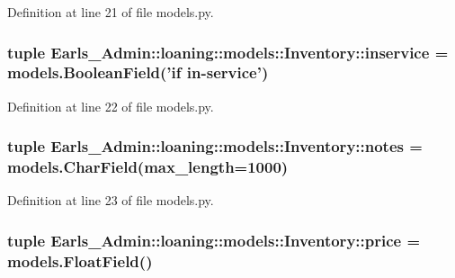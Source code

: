 Definition at line 21 of file models.py.\hypertarget{classEarls__Admin_1_1loaning_1_1models_1_1Inventory_065d22d6f328305f5b3ae87f961646de}{
\subsubsection[inservice]{\setlength{\rightskip}{0pt plus 5cm}tuple {\bf Earls\_\-Admin::loaning::models::Inventory::inservice} = models.BooleanField('if in-service')}}
\label{classEarls__Admin_1_1loaning_1_1models_1_1Inventory_065d22d6f328305f5b3ae87f961646de}




Definition at line 22 of file models.py.\hypertarget{classEarls__Admin_1_1loaning_1_1models_1_1Inventory_84dc6e3885385f9a8e756bff4ede9f3a}{
\subsubsection[notes]{\setlength{\rightskip}{0pt plus 5cm}tuple {\bf Earls\_\-Admin::loaning::models::Inventory::notes} = models.CharField(max\_\-length=1000)}}
\label{classEarls__Admin_1_1loaning_1_1models_1_1Inventory_84dc6e3885385f9a8e756bff4ede9f3a}




Definition at line 23 of file models.py.\hypertarget{classEarls__Admin_1_1loaning_1_1models_1_1Inventory_fbe852b7b819ae0ce974d23cd2114a50}{
\subsubsection[price]{\setlength{\rightskip}{0pt plus 5cm}tuple {\bf Earls\_\-Admin::loaning::models::Inventory::price} = models.FloatField()}}
\label{classEarls__Admin_1_1loaning_1_1models_1_1Inventory_fbe852b7b819ae0ce974d23cd2114a50}




